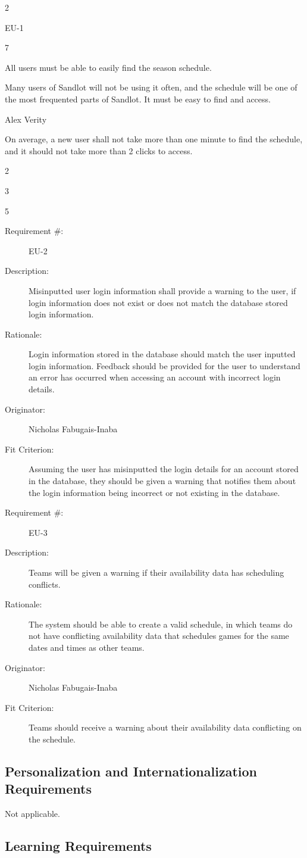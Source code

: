 \documentclass[12pt]{article}
\newenvironment{myreq}[1]{%
\setlist[description]{font=\normalfont\color{darkgray}}%
\begin{tcolorbox}[colframe=black,colback=white, sharp corners, boxrule=1pt]%
\bfseries\color{blue}%
\begin{description}#1}%
{\end{description}\end{tcolorbox}}
\newcommand{\twoinline}[2]{\begin{multicols}{2}#1 #2\end{multicols}}
\newcommand{\reqno}{\item[Requirement \#:]}
\newcommand{\reqevent}{\item[Event/BUC/PUC \#:]}
\newcommand{\reqdesc}{\item[Description:]}
\newcommand{\reqrat}{\item[Rationale:]}
\newcommand{\reqorig}{\item[Originator:]}
\newcommand{\reqfit}{\item[Fit Criterion:]}
\newcommand{\reqsatis}{\item[Customer Satisfaction:]}
\newcommand{\reqdissat}{\item[Customer Dissatisfaction:]}
\begin{document}
\begin{myreq}
  \twoinline
    {\reqno EU-1}
    {\reqevent 7}
  \reqdesc All users must be able to easily find the season schedule.
  \reqrat Many users of Sandlot will not be using it often, and the
  schedule will be one of the most frequented parts of Sandlot. It must be
  easy to find and access. 
  \reqorig Alex Verity
  \reqfit On average, a new user shall not take more than one minute to find
  the schedule, and it should not take more than 2 clicks to access.
  \twoinline
    {\reqsatis 3}
    {\reqdissat 5}
\end{myreq}

\begin{myreq}
  \reqno EU-2
  \reqdesc Misinputted user login information shall provide a warning to the
  user, if login information does not exist or does not match the database
  stored login information.
  \reqrat Login information stored in the database should match the user
  inputted login information. Feedback should be provided for the user to
  understand an error has occurred when accessing an account with incorrect
  login details.
  \reqorig Nicholas Fabugais-Inaba
  \reqfit Assuming the user has misinputted the login details for
  an account stored in the database, they should be given a warning that
  notifies them about the login information being incorrect or not existing
  in the database.
  \twoinline
    {\reqsatis 3}
    {\reqdissat 5}
\end{myreq}

\begin{myreq}
  \reqno EU-3
  \reqdesc Teams will be given a warning if their availability data has
  scheduling conflicts.
  \reqrat The system should be able to create a valid schedule, in which
  teams do not have conflicting availability data that schedules games for
  the same dates and times as other teams.
  \reqorig Nicholas Fabugais-Inaba
  \reqfit Teams should receive a warning about their availability data
  conflicting on the schedule.
  \twoinline
    {\reqsatis 3}
    {\reqdissat 5}
\end{myreq}

\subsection{Personalization and Internationalization Requirements}
Not applicable.

\subsection{Learning Requirements}
\end{document}
